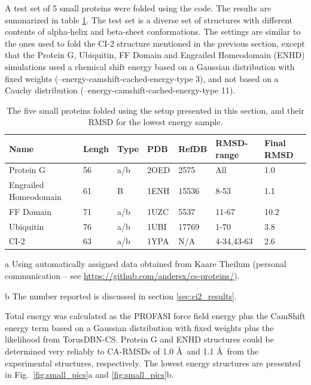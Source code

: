 A test set of 5 small proteins were folded using the code. The results are summarized in table \ref{tab:folding_small}. The test set is a diverse set of structures with different contents of alpha-helix and beta-sheet conformations. 
The settings are similar to the ones used to fold the CI-2 structure mentioned in the previous section, except that the Protein G, Ubiquitin, FF Domain and Engrailed Homeodomain (ENHD) simulations used a chemical shift energy based on a Gaussian distribution with fixed weights (--energy-camshift-cached-energy-type 3), and not based on a Cauchy distribution (--energy-camshift-cached-energy-type 11).
\begin{table}
    \caption{The five small proteins folded using the setup presented in this section, and their RMSD for the lowest energy sample.}
    \begin{center}
    \begin{threeparttable}
    \begin{tabular}{l l l l l  l l}
Name                & Lengh    & Type & PDB     & RefDB     & RMSD-range    & Final RMSD   \\\hline
Protein G           & 56       & a/b & 2OED    & 2575      & All           & 1.0           \\
Engrailed Homeodomain & 61     & B   & 1ENH    & 15536     & 8-53          & 1.1           \\
FF Domain           & 71       & a/b & 1UZC    & 5537      & 11-67         & 10.2         \\
Ubiquitin           & 76       & a/b & 1UBI    & 17769     & 1-70          & 3.8           \\
CI-2                & 63       & a/b & 1YPA    & N/A\tnote{a}& 4-34,43-63  & 2.6\tnote{b}
    \end{tabular}
    \begin{tablenotes}
    \item[a] Using automatically assigned data obtained from Kaare Theilum (personal communication -- see \url{https://github.com/andersx/cs-proteins/}).
    \item[b] The number reported is discussed in section \ref{sec:ci2_results}.
    \end{tablenotes}
    \end{threeparttable}
    \end{center}
    \label{tab:folding_small}
\end{table}
Total energy was calculated as the PROFASI force field energy plus the CamShift energy term based on a Gaussian distribution with fixed weights plus the likelihood from TorusDBN-CS.
Protein G and ENHD structures could be determined very reliably to CA-RMSDs of 1.0 \AA~and 1.1 \AA~from the experimental structures, respectively. The lowest energy structures are presented in Fig.~\ref{fig:small_pics}a and \ref{fig:small_pics}b.

